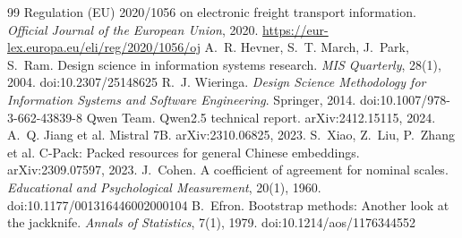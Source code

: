 \documentclass[10pt,twocolumn]{article}
\begin{document}
\begin{thebibliography}{99}
 Regulation (EU) 2020/1056 on electronic freight transport information. \emph{Official Journal of the European Union}, 2020. \url{https://eur-lex.europa.eu/eli/reg/2020/1056/oj}
 A.~R. Hevner, S.~T. March, J.~Park, S.~Ram. Design science in information systems research. \emph{MIS Quarterly}, 28(1), 2004. doi:10.2307/25148625
 R.~J. Wieringa. \emph{Design Science Methodology for Information Systems and Software Engineering}. Springer, 2014. doi:10.1007/978-3-662-43839-8
 Qwen Team. Qwen2.5 technical report. arXiv:2412.15115, 2024.
 A.~Q. Jiang et al. Mistral 7B. arXiv:2310.06825, 2023.
 S.~Xiao, Z.~Liu, P.~Zhang et al. C-Pack: Packed resources for general Chinese embeddings. arXiv:2309.07597, 2023.
 J.~Cohen. A coefficient of agreement for nominal scales. \emph{Educational and Psychological Measurement}, 20(1), 1960. doi:10.1177/001316446002000104
 B.~Efron. Bootstrap methods: Another look at the jackknife. \emph{Annals of Statistics}, 7(1), 1979. doi:10.1214/aos/1176344552
\end{thebibliography}
\end{document}
